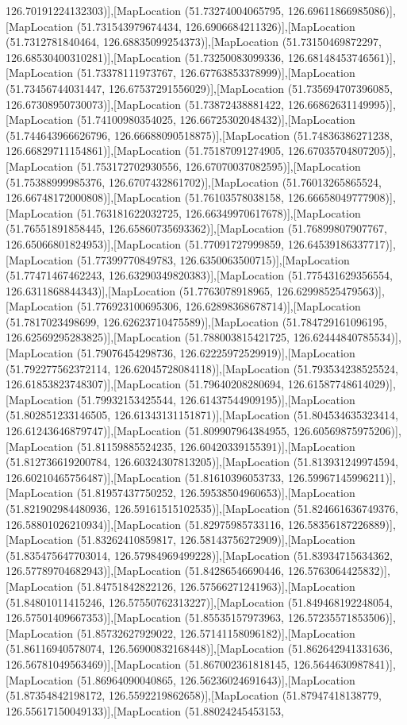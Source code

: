 126.70191224132303)],[MapLocation (51.73274004065795, 126.69611866985086)],[MapLocation (51.731543979674434, 126.6906684211326)],[MapLocation (51.7312781840464, 126.68835099254373)],[MapLocation (51.73150469872297, 126.68530400310281)],[MapLocation (51.73250083099336, 126.68148453746561)],[MapLocation (51.73378111973767, 126.67763853378999)],[MapLocation (51.73456744031447, 126.67537291556029)],[MapLocation (51.735694707396085, 126.67308950730073)],[MapLocation (51.73872438881422, 126.66862631149995)],[MapLocation (51.74100980354025, 126.66725302048432)],[MapLocation (51.744643966626796, 126.66688090518875)],[MapLocation (51.74836386271238, 126.66829711154861)],[MapLocation (51.75187091274905, 126.67035704807205)],[MapLocation (51.753172702930556, 126.67070037082595)],[MapLocation (51.75388999985376, 126.6707432861702)],[MapLocation (51.76013265865524, 126.66748172000808)],[MapLocation (51.76103578038158, 126.66658049777908)],[MapLocation (51.763181622032725, 126.66349970617678)],[MapLocation (51.76551891858445, 126.65860735693362)],[MapLocation (51.76899807907767, 126.65066801824953)],[MapLocation (51.77091727999859, 126.64539186337717)],[MapLocation (51.77399770849783, 126.6350063500715)],[MapLocation (51.77471467462243, 126.63290349820383)],[MapLocation (51.775431629356554, 126.6311868844343)],[MapLocation (51.7763078918965, 126.62998525479563)],[MapLocation (51.776923100695306, 126.62898368678714)],[MapLocation (51.7817023498699, 126.62623710475589)],[MapLocation (51.784729161096195, 126.62569295283825)],[MapLocation (51.788003815421725, 126.62444840785534)],[MapLocation (51.79076454298736, 126.62225972529919)],[MapLocation (51.792277562372114, 126.62045728084118)],[MapLocation (51.793534238525524, 126.61853823748307)],[MapLocation (51.79640208280694, 126.61587748614029)],[MapLocation (51.79932153425544, 126.61437544909195)],[MapLocation (51.802851233146505, 126.61343131151871)],[MapLocation (51.804534635323414, 126.61243646879747)],[MapLocation (51.809907964384955, 126.60569875975206)],[MapLocation (51.81159885524235, 126.60420339155391)],[MapLocation (51.812736619200784, 126.60324307813205)],[MapLocation (51.813931249974594, 126.60210465756487)],[MapLocation (51.81610396053733, 126.59967145996211)],[MapLocation (51.81957437750252, 126.59538504960653)],[MapLocation (51.821902984480936, 126.59161515102535)],[MapLocation (51.824661636749376, 126.58801026210934)],[MapLocation (51.82975985733116, 126.58356187226889)],[MapLocation (51.83262410859817, 126.58143756272909)],[MapLocation (51.835475647703014, 126.57984969499228)],[MapLocation (51.83934715634362, 126.57789704682943)],[MapLocation (51.84286546690446, 126.5763064425832)],[MapLocation (51.84751842822126, 126.57566271241963)],[MapLocation (51.84801011415246, 126.57550762313227)],[MapLocation (51.849468192248054, 126.57501409667353)],[MapLocation (51.85535157973963, 126.57235571853506)],[MapLocation (51.85732627929022, 126.57141158096182)],[MapLocation (51.86116940578074, 126.56900832168448)],[MapLocation (51.862642941331636, 126.56781049563469)],[MapLocation (51.867002361818145, 126.5644630987841)],[MapLocation (51.86964090040865, 126.56236024691643)],[MapLocation (51.87354842198172, 126.5592219862658)],[MapLocation (51.87947418138779, 126.55617150049133)],[MapLocation (51.88024245453153, 